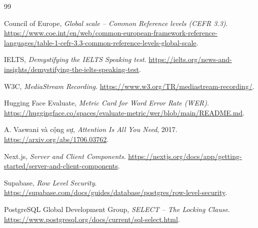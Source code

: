 \documentclass[12pt,a4paper,oneside]{report}
\begin{document}
\begin{thebibliography}{99}

Council of Europe, \textit{Global scale -- Common Reference levels (CEFR 3.3)}.
\url{https://www.coe.int/en/web/common-european-framework-reference-languages/table-1-cefr-3.3-common-reference-levels-global-scale}.

IELTS, \textit{Demystifying the IELTS Speaking test}.
\url{https://ielts.org/news-and-insights/demystifying-the-ielts-speaking-test}.

W3C, \textit{MediaStream Recording}.
\url{https://www.w3.org/TR/mediastream-recording/}.

Hugging Face Evaluate, \textit{Metric Card for Word Error Rate (WER)}.
\url{https://huggingface.co/spaces/evaluate-metric/wer/blob/main/README.md}.

A. Vaswani và cộng sự, \textit{Attention Is All You Need}, 2017.
\url{https://arxiv.org/abs/1706.03762}.

Next.js, \textit{Server and Client Components}.
\url{https://nextjs.org/docs/app/getting-started/server-and-client-components}.

Supabase, \textit{Row Level Security}.
\url{https://supabase.com/docs/guides/database/postgres/row-level-security}.

PostgreSQL Global Development Group, \textit{SELECT -- The Locking Clause}.
\url{https://www.postgresql.org/docs/current/sql-select.html}.

\end{thebibliography}


\end{document}
